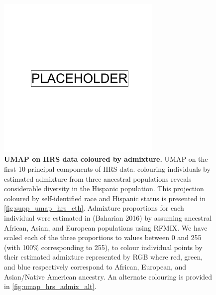 \begin{figure}
\centering
    \includegraphics[width=0.7\textwidth]{placeholder.png}
   \caption[UMAP on HRS data coloured by admixture]{\textbf{UMAP on HRS data coloured by admixture.} UMAP on the first 10 principal components of HRS data. colouring individuals by estimated admixture from three ancestral populations reveals considerable diversity in the Hispanic population. This projection coloured by self-identified race and Hispanic status is presented in \ref{fig:supp_umap_hrs_eth}. Admixture proportions for each individual were estimated in (Baharian 2016) by assuming ancestral African, Asian, and European populations using RFMIX. We have scaled each of the three proportions to values between 0 and 255 (with 100\% corresponding to 255), to colour individual points by their estimated admixture represented by RGB where red, green, and blue respectively correspond to African, European, and Asian/Native American ancestry. An alternate colouring is provided in \ref{fig:umap_hrs_admix_alt}.}
    \label{fig:umap_hrs_admix}
\end{figure}

\newpage

